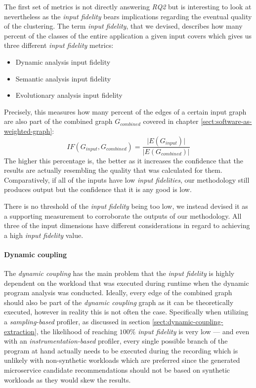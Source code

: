 \documentclass[12pt,a4paper]{report}
\begin{document}
The first set of metrics is not directly answering \textit{RQ2} but is interesting
to look at nevertheless as the \textit{input fidelity} bears implications
regarding the eventual quality of the clustering.
The term \textit{input fidelity}, that we devised, describes how many percent
of the classes of the entire application a given input covers which gives us
three different \textit{input fidelity} metrics:
\begin{itemize}[noitemsep]
  \item Dynamic analysis input fidelity
  \item Semantic analysis input fidelity
  \item Evolutionary analysis input fidelity
\end{itemize}

Precisely, this measures how many percent of the edges of a certain input graph
are also part of the combined graph \(G_{combined}\) covered in chapter
\ref{sect:software-as-weighted-graph}:
\[
  IF(G_{input}, G_{combined}) = \frac{\vert E(G_{input}) \vert}{\vert E(G_{combined}) \vert}
\]
The higher this percentage is, the better as it increases the confidence
that the results are actually resembling the quality that was calculated for them.
Comparatively, if all of the inputs have low \textit{input fidelities},
our methodology still produces output but the confidence that it is any good is low.

There is no threshold of the \textit{input fidelity} being too low,
we instead devised it as a supporting measurement to corroborate the outputs
of our methodology. All three of the input dimensions have different
considerations in regard to achieving a high \textit{input fidelity} value.

\paragraph{Dynamic coupling}
The \textit{dynamic coupling} has the main problem that the \textit{input fidelity}
is highly dependent on the workload that was executed during runtime when the
dynamic program analysis was conducted. Ideally, every edge of the combined graph
should also be part of the \textit{dynamic coupling} graph as it can be
theoretically executed, however in reality this is not often the case.
Specifically when utilizing a \textit{sampling\hyp based} profiler,
as discussed in section \ref{sect:dynamic-coupling-extraction},
the likelihood of reaching \(100\%\) \textit{input fidelity} is very low ---
and even with an \textit{instrumentation\hyp based} profiler,
every single possible branch of the program at hand actually needs to be
executed during the recording which is unlikely with non\hyp synthetic workloads
which are preferred since the generated microservice candidate recommendations
should not be based on synthetic workloads as they would skew the results.
\end{document}
